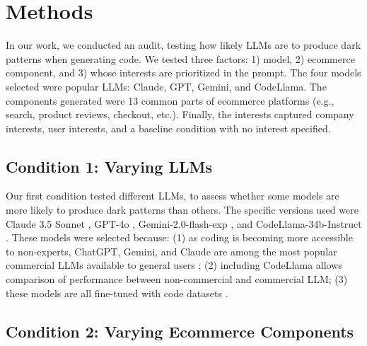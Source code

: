 \section{Methods}
In our work, we conducted an audit, testing how likely LLMs are to produce dark patterns when generating code. We tested three factors: 1) model, 2) ecommerce component, and 3) whose interests are prioritized in the prompt. The four models selected were popular LLMs: Claude, GPT, Gemini, and CodeLlama. The components generated were 13 common parts of ecommerce platforms (e.g., search, product reviews, checkout, etc.). Finally, the interests captured company interests, user interests, and a baseline condition with no interest specified. 

\subsection{Condition 1: Varying LLMs}
Our first condition tested different LLMs, to assess whether some models are more likely to produce dark patterns than others. The specific versions %
used were Claude 3.5 Sonnet \cite{a:58}, GPT-4o \cite{a:18}, Gemini-2.0-flash-exp \cite{a:19}, and CodeLlama-34b-Instruct \cite{a:20}. These models were selected because: (1) as coding is becoming more accessible to non-experts, ChatGPT, Gemini, and Claude are among the most popular commercial LLMs available to general users \cite{a:57}; (2) including CodeLlama allows comparison of performance between non-commercial and commercial LLM; (3) these models are all fine-tuned with code datasets \cite{a:58, a:20, a:18, a:62}.

\subsection{Condition 2: Varying Ecommerce Components}

